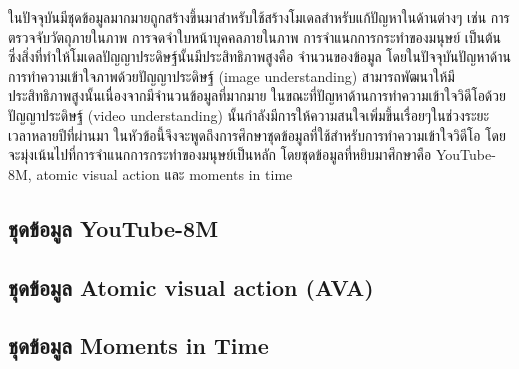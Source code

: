 \label{sec:dataset}
ในปัจจุบันมีชุดข้อมูลมากมายถูกสร้างขึ้นมาสำหรับใช้สร้างโมเดลสำหรับแก้ปัญหาในด้านต่างๆ เช่น การตรวจจับวัตถุภายในภาพ
การจดจำใบหน้าบุคคลภายในภาพ การจำแนกการกระทำของมนุษย์ เป็นต้น ซึ่งสิ่งที่ทำให้โมเดลปัญญาประดิษฐ์นั้นมีประสิทธิภาพสูงคือ
จำนวนของข้อมูล โดยในปัจจุบันปัญหาด้านการทำความเข้าใจภาพด้วยปัญญาประดิษฐ์ (image understanding) 
สามารถพัฒนาให้มีประสิทธิภาพสูงนั้นเนื่องจากมีจำนวนข้อมูลที่มากมาย ในขณะที่ปัญหาด้านการทำความเข้าใจวิดีโอด้วยปัญญาประดิษฐ์ (video understanding) 
นั้นกำลังมีการให้ความสนใจเพิ่มขึ้นเรื่อยๆในช่วงระยะเวลาหลายปีที่ผ่านมา ในหัวข้อนี้จึงจะพูดถึงการศึกษาชุดข้อมูลที่ใช้สำหรับการทำความเข้าใจวิดีโอ 
โดยจะมุ่งเน้นไปที่การจำแนกการกระทำของมนุษย์เป็นหลัก โดยชุดข้อมูลที่หยิบมาศึกษาคือ YouTube-8M, atomic visual action และ moments in time

\subsection{ชุดข้อมูล YouTube-8M} 

\clearpage
\subsection{ชุดข้อมูล Atomic visual action (AVA)}	

\clearpage
\subsection{ชุดข้อมูล Moments in Time}
